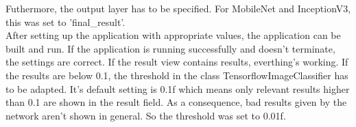 Futhermore, the output layer has to be specified. For MobileNet and InceptionV3, this was set to 'final_result'. \\

After setting up the application with appropriate values, the application can be built and run. If the application is running successfully and doesn't terminate, the settings are correct. If the result view contains results, everthing's working. If the results are below 0.1, the threshold in the class TensorflowImageClassifier has to be adapted. It's default setting is 0.1f which means only relevant results higher than 0.1 are shown in the result field. As a consequence, bad results given by the network aren't shown in general. So the threshold was set to 0.01f.